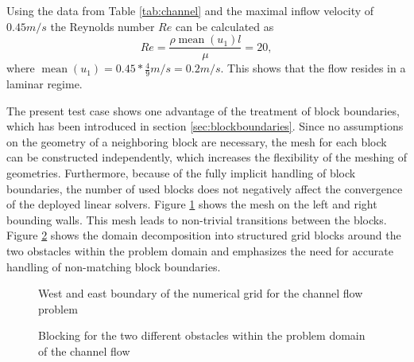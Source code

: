 Using the data from Table \ref{tab:channel} and the maximal inflow velocity of $0.45m/s$ the Reynolds number \(Re\) can be calculated as
\begin{displaymath}
  Re = \frac{\rho \operatorname{mean}(u_1) l}{\mu} = 20,
\end{displaymath}
where \(\textstyle \operatorname{mean}(u_1) = 0.45*\frac{4}{9} m/s = 0.2 m/s\). This shows that the flow resides in a laminar regime.

The present test case shows one advantage of the treatment of block boundaries, which has been introduced in section \ref{sec:blockboundaries}. Since no assumptions on the geometry of a neighboring block are necessary, the mesh for each block can be constructed independently, which increases the flexibility of the meshing of geometries. Furthermore, because of the fully implicit handling of block boundaries, the number of used blocks does not negatively affect the convergence of the deployed linear solvers. Figure \ref{fig:channel1} shows the mesh on the left and right bounding walls. This mesh leads to non-trivial transitions between the blocks. Figure \ref{fig:blocking} shows the domain decomposition into structured grid blocks around the two obstacles within the problem domain and emphasizes the need for accurate handling of non-matching block boundaries.

\begin{figure}
  \centering
  
  \caption{West and east boundary of the numerical grid for the channel flow problem}
  \label{fig:channel1}
\end{figure}

%  

\begin{figure}
   \centering
    \hfill
    \caption{Blocking for the two different obstacles within the problem domain of the channel flow}
    \label{fig:blocking}
\end{figure}

